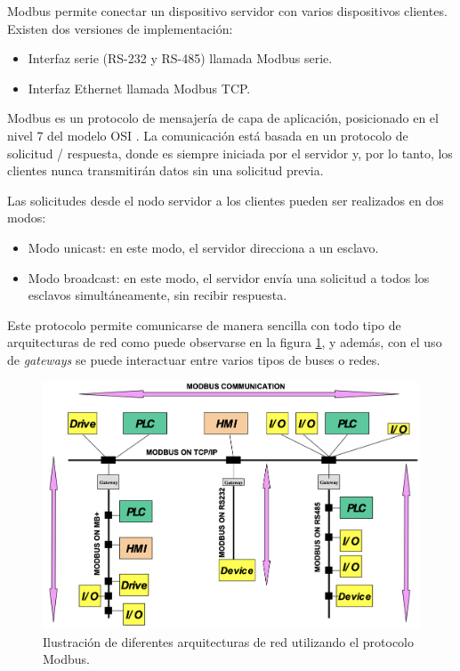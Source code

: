 Modbus permite conectar un dispositivo servidor con varios dispositivos clientes.  Existen dos versiones de implementación:
\begin{itemize}
	\item Interfaz serie (RS-232 y RS-485) llamada Modbus serie.
	\item Interfaz Ethernet llamada Modbus TCP.
\end{itemize}

Modbus es un protocolo de mensajería de capa de aplicación, posicionado en el nivel 7 del modelo OSI \citep{WEBSITE:3}.  La comunicación está basada en un protocolo de solicitud / respuesta,  donde es siempre iniciada por el servidor y,  por lo tanto, los clientes nunca transmitirán datos sin una solicitud previa.  

Las solicitudes desde el nodo servidor a los clientes pueden ser realizados en dos modos:
\begin{itemize}
	\item Modo unicast: en este modo,  el servidor direcciona a un esclavo.
	\item Modo broadcast: en este modo, el servidor envía una solicitud a todos los esclavos simultáneamente, sin recibir respuesta.
\end{itemize}

Este protocolo permite comunicarse de manera sencilla con todo tipo de arquitecturas de red como puede observarse en la figura \ref{fig:red-modbus}, y además,  con el uso de \textit{gateways} se puede interactuar entre varios tipos de buses o redes.

\begin{figure}[htpb]
	\centering
	\includegraphics[scale=.35]{./Figures/red-modbus.png}
	\caption[Arquitectura de red Modbus.]{Ilustración de diferentes arquitecturas de red utilizando el protocolo Modbus\protect\footnotemark.}
	\label{fig:red-modbus}
\end{figure}

